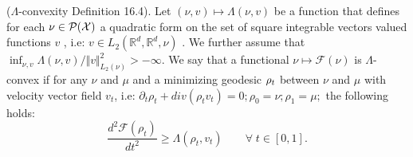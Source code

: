 %
\begin{definition}\label{def:lambda-convexity}
($\Lambda$-convexity \cite{Villani:2009} Definition 16.4). Let $(\nu,v)\mapsto\Lambda(\nu,v)$
be a function that defines for each $\nu \in \mathcal{P}({{\mathcal X}})$
a quadratic form on the set of square integrable vectors valued functions
$v$ , i.e: $v\in L_{2}(\mathbb{R}^{d},\mathbb{R}^{d},\nu)$ . We
further assume that $\inf_{\nu,v}\Lambda(\nu,v)/\Vert v\Vert_{L_{2}(\nu)}^{2}>-\infty$.
We say that a functional $\nu\mapsto\mathcal{F}(\nu)$ is $\Lambda$-convex
if for any $\nu$ and $\mu$ and a minimizing geodesic $\text{\ensuremath{\rho_{t}}}$
between $\nu$ and $\mu$ with velocity vector field $v_{t}$, i.e:
$\partial_{t}\rho_{t}+div(\rho_{t}v_{t})=0;\rho_{0}=\nu;\rho_{1}=\mu;$
the following holds:
\begin{equation*}
\frac{d^{2}\mathcal{F}(\rho_{t})}{dt^{2}}\geq\Lambda(\rho_{t},v_{t})\qquad\forall\; t\in[0,1].
\end{equation*}
\end{definition}

